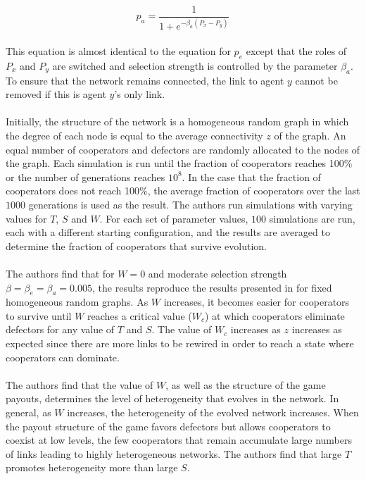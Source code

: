 \documentclass{article}
\begin{document}
	\begin{equation}
	p_a=\frac{1}{1+e^{-\beta_a(P_x-P_y)}}
	\end{equation}

	\paragraph{}This equation is almost identical to the equation for $p_e$ except that the roles of $P_x$ and $P_y$ are switched and selection strength is controlled by the parameter $\beta_a$.  To ensure that the network remains connected, the link to agent $y$ cannot be removed if this is agent $y$'s only link.
	\paragraph{}Initially, the structure of the network is a homogeneous random graph in which the degree of each node is equal to the average connectivity $z$ of the graph.  An equal number of cooperators and defectors are randomly allocated to the nodes of the graph.  Each simulation is run until the fraction of cooperators reaches 100\% or the number of generations reaches $10^8$.  In the case that the fraction of cooperators does not reach 100\%, the average fraction of cooperators over the last $1000$ generations is used as the result.  The authors run simulations with varying values for $T$, $S$ and $W$.  For each set of parameter values, $100$ simulations are run, each with a different starting configuration, and the results are averaged to determine the fraction of cooperators that survive evolution.
	\paragraph{}The authors find that for $W=0$ and moderate selection strength $\beta=\beta_e=\beta_a=0.005$, the results reproduce the results presented in \cite{Santos2006c} for fixed homogeneous random graphs.  As $W$ increases, it becomes easier for cooperators to survive until $W$ reaches a critical value ($W_c$) at which cooperators eliminate defectors for any value of $T$ and $S$.  The value of $W_c$ increases as $z$ increases as expected since there are more links to be rewired in order to reach a state where cooperators can dominate.
	\paragraph{}The authors find that the value of $W$, as well as the structure of the game payouts, determines the level of heterogeneity that evolves in the network.  In general, as $W$ increases, the heterogeneity of the evolved network increases.  When the payout structure of the game favors defectors but allows cooperators to coexist at low levels, the few cooperators that remain accumulate large numbers of links leading to highly heterogeneous networks.  The authors find that large $T$ promotes heterogeneity more than large $S$.
\end{document}

